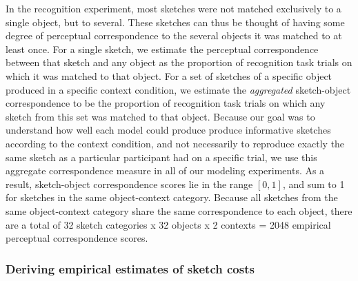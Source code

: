 \documentclass[9pt,twocolumn,twoside]{pnas-new}
\begin{document}
{%
In the recognition experiment, most sketches were not matched exclusively to a single object, but to several. 
These sketches can thus be thought of having some degree of perceptual correspondence to the several objects it was matched to at least once. 
For a single sketch, we estimate the perceptual correspondence between that sketch and any object as the proportion of recognition task trials on which it was matched to that object. 
For a set of sketches of a specific object produced in a specific context condition, we estimate the \textit{aggregated} sketch-object correspondence to be the proportion of recognition task trials on which any sketch from this set was matched to that object. 
Because our goal was to understand how well each model could produce produce informative sketches according to the context condition, and not necessarily to reproduce exactly the same sketch as a particular participant had on a specific trial, we use this aggregate correspondence measure in all of our modeling experiments.  
As a result, sketch-object correspondence scores lie in the range $[0,1]$, and sum to 1 for sketches in the same object-context category. 
Because all sketches from the same object-context category share the same correspondence to each object, there are a total of 32 sketch categories x 32 objects x 2 contexts = 2048 empirical perceptual correspondence scores.


\subsubsection*{Deriving empirical estimates of sketch costs}

}
\end{document}
